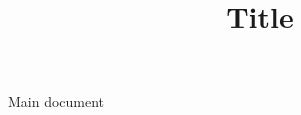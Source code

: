 \documentclass[man]{apa7}
\title{Title}
\begin{document}
\maketitle
{}

Main document

\begingroup
\parindent 0pt
\def\enotesize{\normalsize}
\theendnotes
\endgroup

\printbibliography
\end{document}
